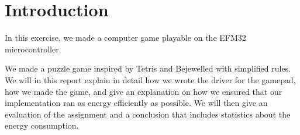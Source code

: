 \section{Introduction}

In this exercise, we made a computer game playable on the EFM32 microcontroller.

We made a puzzle game inspired by Tetris and Bejewelled with simplified rules. We will in this report explain in detail how we wrote the driver for the gamepad, how we made the game, and give an explanation on how we ensured that our implementation ran as energy efficiently as possible. We will then give an evaluation of the assignment and a conclusion that includes statistics about the energy consumption. 
